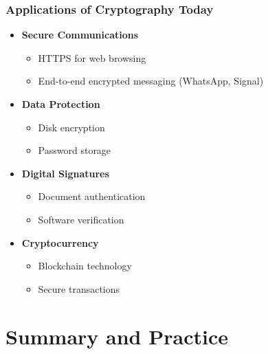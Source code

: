 \documentclass{beamer}
\begin{document}
\begin{frame}
    \frametitle{Applications of Cryptography Today}
    
    \begin{itemize}
        \item \textbf{Secure Communications}
            \begin{itemize}
                \item HTTPS for web browsing
                \item End-to-end encrypted messaging (WhatsApp, Signal)
            \end{itemize}
        \item \textbf{Data Protection}
            \begin{itemize}
                \item Disk encryption
                \item Password storage
            \end{itemize}
        \item \textbf{Digital Signatures}
            \begin{itemize}
                \item Document authentication
                \item Software verification
            \end{itemize}
        \item \textbf{Cryptocurrency}
            \begin{itemize}
                \item Blockchain technology
                \item Secure transactions
            \end{itemize}
    \end{itemize}
\end{frame}

\section{Summary and Practice}
\end{document}
